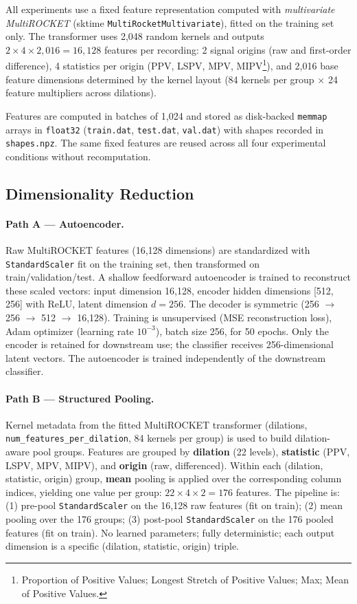 \documentclass[10pt,twocolumn,letterpaper]{article}
\begin{document}
All experiments use a fixed feature representation computed with \emph{multivariate MultiROCKET} (sktime \texttt{MultiRocketMultivariate}), fitted on the training set only. The transformer uses 2,048 random kernels and outputs $2 \times 4 \times 2{,}016 = 16{,}128$ features per recording: 2 signal origins (raw and first-order difference), 4 statistics per origin (PPV, LSPV, MPV, MIPV\footnote{Proportion of Positive Values; Longest Stretch of Positive Values; Max; Mean of Positive Values.}), and 2,016 base feature dimensions determined by the kernel layout (84 kernels per group $\times$ 24 feature multipliers across dilations).

Features are computed in batches of 1,024 and stored as disk-backed \texttt{memmap} arrays in \texttt{float32} (\texttt{train.dat}, \texttt{test.dat}, \texttt{val.dat}) with shapes recorded in \texttt{shapes.npz}. The same fixed features are reused across all four experimental conditions without recomputation.

\subsection{Dimensionality Reduction}

\paragraph{Path A — Autoencoder.}
Raw MultiROCKET features (16,128 dimensions) are standardized with \texttt{StandardScaler} fit on the training set, then transformed on train/validation/test. A shallow feedforward autoencoder is trained to reconstruct these scaled vectors: input dimension 16,128, encoder hidden dimensions [512, 256] with ReLU, latent dimension $d = 256$. The decoder is symmetric (256 $\to$ 256 $\to$ 512 $\to$ 16,128). Training is unsupervised (MSE reconstruction loss), Adam optimizer (learning rate $10^{-3}$), batch size 256, for 50 epochs. Only the encoder is retained for downstream use; the classifier receives 256-dimensional latent vectors. The autoencoder is trained independently of the downstream classifier.

\paragraph{Path B — Structured Pooling.}
Kernel metadata from the fitted MultiROCKET transformer (dilations, \texttt{num\_features\_per\_dilation}, 84 kernels per group) is used to build dilation-aware pool groups. Features are grouped by \textbf{dilation} (22 levels), \textbf{statistic} (PPV, LSPV, MPV, MIPV), and \textbf{origin} (raw, differenced). Within each (dilation, statistic, origin) group, \textbf{mean} pooling is applied over the corresponding column indices, yielding one value per group: $22 \times 4 \times 2 = 176$ features. The pipeline is: (1) pre-pool \texttt{StandardScaler} on the 16,128 raw features (fit on train); (2) mean pooling over the 176 groups; (3) post-pool \texttt{StandardScaler} on the 176 pooled features (fit on train). No learned parameters; fully deterministic; each output dimension is a specific (dilation, statistic, origin) triple.
\end{document}
